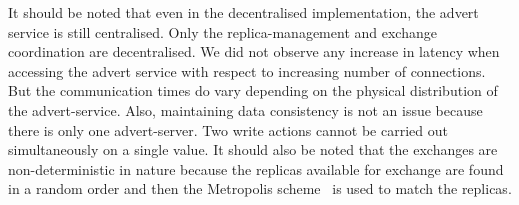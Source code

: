 \documentclass{rspublic}
\newcommand{\jhanote}[1]{ {\textcolor{red} { ***shantenu: #1 }}}
\newcommand{\alnote}[1]{ {\textcolor{blue} { ***andre: #1 }}}
\newcommand{\athotanote}[1]{ {\textcolor{green} { ***athota: #1 }}}
\newcommand{\alnote}[1]{}
\newcommand{\athotanote}[1]{}
\newcommand{\jhanote}[1]{}
\begin{document}
It should be noted that even in the decentralised implementation, the
advert service is still centralised. Only the replica-management and exchange coordination are decentralised. We did not observe any increase
in latency when accessing the advert service with respect to
increasing number of connections.  %
But the communication times do vary depending on the physical
distribution of the advert-service. Also, maintaining data consistency is not an issue
because there is only one advert-server.  %
Two write actions cannot be carried out simultaneously on a single value.
It should also be noted that the exchanges are non-deterministic in
nature because the replicas available for exchange are found in a
random order and then the Metropolis scheme~\citep{metropolis:1087} is
used to match the replicas.






\end{document}
